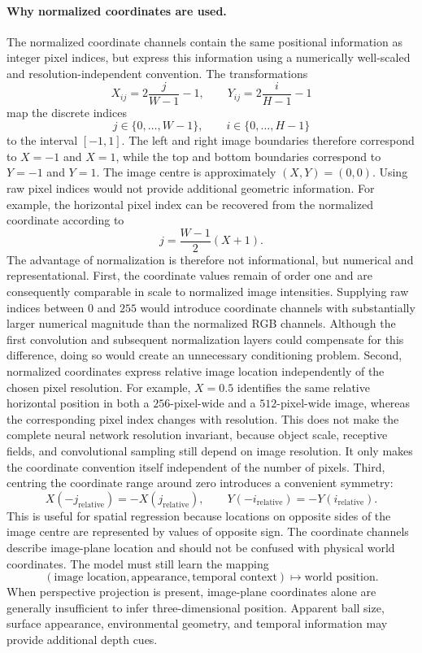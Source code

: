 \documentclass[11pt,a4paper]{article}
\begin{document}
\paragraph{Why normalized coordinates are used.} 
The normalized coordinate channels contain the same positional information as integer pixel indices, but express this information using a numerically well-scaled and resolution-independent convention. The transformations 
\begin{equation}
	X_{ij}=2\frac{j}{W-1}-1, \qquad Y_{ij}=2\frac{i}{H-1}-1 
\end{equation} 
map the discrete indices \[ j\in\{0,\ldots,W-1\}, \qquad i\in\{0,\ldots,H-1\} \] to the interval $[-1,1]$. The left and right image boundaries therefore correspond to $X=-1$ and $X=1$, while the top and bottom boundaries correspond to $Y=-1$ and $Y=1$. The image centre is approximately $(X,Y)=(0,0)$. Using raw pixel indices would not provide additional geometric information. For example, the horizontal pixel index can be recovered from the normalized coordinate according to 
\begin{equation}
	 j=\frac{W-1}{2}(X+1). 
\end{equation} 
The advantage of normalization is therefore not informational, but numerical and representational. First, the coordinate values remain of order one and are consequently comparable in scale to normalized image intensities. Supplying raw indices between $0$ and $255$ would introduce coordinate channels with substantially larger numerical magnitude than the normalized RGB channels. Although the first convolution and subsequent normalization layers could compensate for this difference, doing so would create an unnecessary conditioning problem. Second, normalized coordinates express relative image location independently of the chosen pixel resolution. For example, $X=0.5$ identifies the same relative horizontal position in both a $256$-pixel-wide and a $512$-pixel-wide image, whereas the corresponding pixel index changes with resolution. This does not make the complete neural network resolution invariant, because object scale, receptive fields, and convolutional sampling still depend on image resolution. It only makes the coordinate convention itself independent of the number of pixels. Third, centring the coordinate range around zero introduces a convenient symmetry: \[ X(-j_{\mathrm{relative}})=-X(j_{\mathrm{relative}}), \qquad Y(-i_{\mathrm{relative}})=-Y(i_{\mathrm{relative}}). \] This is useful for spatial regression because locations on opposite sides of the image centre are represented by values of opposite sign. The coordinate channels describe image-plane location and should not be confused with physical world coordinates. The model must still learn the mapping 
\begin{equation} 
	(\text{image location},\text{appearance},\text{temporal context}) \longmapsto \text{world position}. 
\end{equation} 
When perspective projection is present, image-plane coordinates alone are generally insufficient to infer three-dimensional position. Apparent ball size, surface appearance, environmental geometry, and temporal information may provide additional depth cues.
\end{document}
